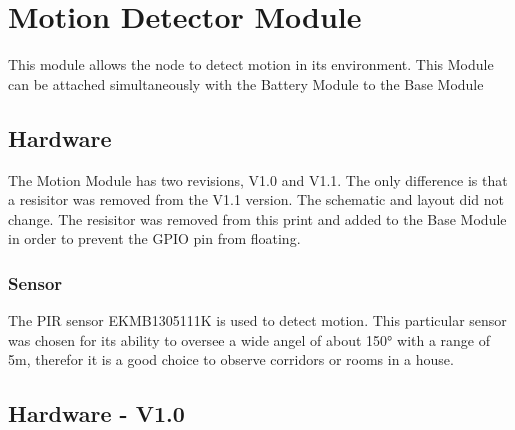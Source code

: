 \section{Motion Detector Module} 
This module allows the node to detect motion in its environment. This Module can be 
attached simultaneously with the Battery Module to the Base Module
\subsection {Hardware}
The Motion Module has two revisions, V1.0 and V1.1. The only difference is that 
a resisitor was removed from the V1.1 version. The schematic and layout did not 
change. The resisitor was removed from this print and added to the Base Module
in order to prevent the GPIO pin from floating.
\subsubsection{Sensor}
The PIR sensor EKMB1305111K is used to detect motion. This particular sensor was chosen
for its ability to oversee a wide angel of about 150° with a range of 5m, therefor it is
a good choice to observe corridors or rooms in a house.

\subsection {Hardware - V1.0}